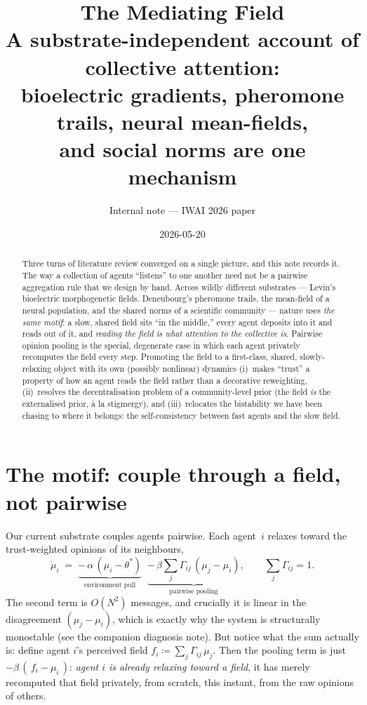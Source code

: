 \documentclass[11pt,a4paper]{article}
\title{The Mediating Field\\[3pt]
\large A substrate-independent account of collective attention:\\
bioelectric gradients, pheromone trails, neural mean-fields,\\
and social norms are one mechanism}
\author{Internal note --- IWAI 2026 paper}
\date{2026-05-20}
\theoremstyle{plain}
\begin{document}
\maketitle

\begin{abstract}
Three turns of literature review converged on a single picture, and this
note records it. The way a collection of agents ``listens'' to one another
need not be a pairwise aggregation rule that we design by hand. Across
wildly different substrates --- Levin's bioelectric morphogenetic fields,
Deneubourg's pheromone trails, the mean-field of a neural population, and
the shared norms of a scientific community --- nature uses \emph{the same
motif}: a slow, shared field sits ``in the middle,'' every agent deposits
into it and reads out of it, and \emph{reading the field is what attention
to the collective \emph{is}}. Pairwise opinion pooling is the special,
degenerate case in which each agent privately recomputes the field every
step. Promoting the field to a first-class, shared, slowly-relaxing object
with its own (possibly nonlinear) dynamics (i)~makes ``trust'' a property
of how an agent reads the field rather than a decorative reweighting,
(ii)~resolves the decentralisation problem of a community-level prior
(the field \emph{is} the externalised prior, \`a la stigmergy), and
(iii)~relocates the bistability we have been chasing to where it belongs:
the self-consistency between fast agents and the slow field.
\end{abstract}

\section{The motif: couple through a field, not pairwise}
\label{sec:motif}

Our current substrate couples agents pairwise. Each agent~$i$ relaxes toward
the trust-weighted opinions of its neighbours,
\begin{equation}
\dot\mu_i \;=\; \underbrace{-\,\alpha\,(\mu_i-\theta^\ast)}_{\text{environment pull}}
\;\;\underbrace{-\,\beta\sum_{j} \Gamma_{ij}\,(\mu_j-\mu_i)}_{\text{pairwise pooling}} ,
\qquad \textstyle\sum_j \Gamma_{ij}=1 .
\label{eq:pairwise}
\end{equation}
The second term is $O(N^2)$ messages, and crucially it is linear in the
disagreement $(\mu_j-\mu_i)$, which is exactly why the system is
structurally monostable (see the companion diagnosis note). But notice what
the sum actually is: define agent $i$'s perceived field
$f_i \coloneqq \sum_j \Gamma_{ij}\,\mu_j$. Then the pooling term is just
$-\beta\,(\,f_i - \mu_i\,)$: \emph{agent $i$ is already relaxing toward a
field}, it has merely recomputed that field privately, from scratch, this
instant, from the raw opinions of others.
\end{document}
